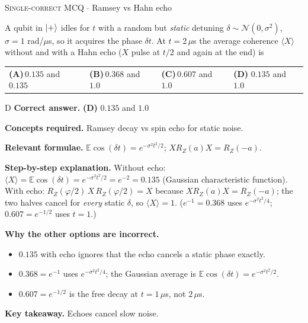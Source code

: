 \documentclass[11pt,a4paper]{article}
\newcommand{\optlabel}[1]{\textbf{(#1)}}
\newcommand{\correctlabel}[1]{\textcolor{okgreen}{\textbf{(#1)}\,\ding{51}}}
\newenvironment{qitem}[1]{\begin{list}{}{\setlength{\leftmargin}{3.3em}\setlength{\labelwidth}{3.1em}%
  \setlength{\labelsep}{0.2em}\setlength{\topsep}{3pt}\setlength{\parsep}{3pt}}\item[\textbf{Q.#1}\hfill]}{\end{list}}
\newcommand{\qsep}{\par\vspace{2pt}{\color{black!15}\hrule}\vspace{4pt}}
\newcommand{\qmeta}[2]{{\footnotesize\color{black!60}\textsc{#1} \;$\cdot$\; #2}\par}
\begin{document}
\begin{qitem}{68}
\qmeta{Single-correct MCQ}{Ramsey vs Hahn echo}
A qubit in $\ket+$ idles for $t$ with a random but \emph{static} detuning $\delta \sim \mathcal N(0, \sigma^2)$, $\sigma = 1$ rad/$\mu$s, so it acquires the phase $\delta t$. At
$t = 2\,\mu$s the average coherence $\langle X\rangle$ without and with a Hahn echo ($X$ pulse at $t/2$ and again at the end) is
\par\smallskip\noindent\begin{tabularx}{\linewidth}{@{}*{4}{L}@{}}
\optlabel{A}\,$0.135$ and $0.135$ & \optlabel{B}\,$0.368$ and $1.0$ & \optlabel{C}\,$0.607$ and $1.0$ & \correctlabel{D}\,$0.135$ and $1.0$
\end{tabularx}
\end{qitem}
\begin{solbox}{D}
\textbf{\color{brand}Correct answer.} \textcolor{okgreen}{\textbf{(D)}} $0.135$ and $1.0$

\textbf{\color{brand}Concepts required.} Ramsey decay vs spin echo for static noise.

\textbf{\color{brand}Relevant formulae.} $\mathbb E\cos(\delta t) = e^{-\sigma^2t^2/2}$; $XR_Z(a)X = R_Z(-a)$.

\textbf{\color{brand}Step-by-step explanation.} Without echo: $\langle X\rangle = \mathbb E\cos(\delta t) = e^{-\sigma^2t^2/2} = e^{-2} = 0.135$ (Gaussian characteristic function).
With echo: $R_Z(\varphi/2)\,X\,R_Z(\varphi/2) = X$ because $XR_Z(a)X = R_Z(-a)$; the two halves cancel for \emph{every} static $\delta$, so $\langle X\rangle = 1$.
($e^{-1} = 0.368$ uses $e^{-\sigma^2t^2/4}$; $0.607 = e^{-1/2}$ uses $t = 1$.)

\textbf{\color{brand}Why the other options are incorrect.}
\begin{itemize}[leftmargin=2.4em, itemsep=1pt, topsep=2pt]
\item[\textbf{(A)}] $0.135$ with echo ignores that the echo cancels a static phase exactly.
\item[\textbf{(B)}] $0.368 = e^{-1}$ uses $e^{-\sigma^2t^2/4}$; the Gaussian average is $\mathbb E\cos(\delta t) = e^{-\sigma^2t^2/2}$.
\item[\textbf{(C)}] $0.607 = e^{-1/2}$ is the free decay at $t = 1\,\mu$s, not $2\,\mu$s.
\end{itemize}
\textbf{\color{brand}Key takeaway.} Echoes cancel slow noise.
\end{solbox}
\qsep
\end{document}
